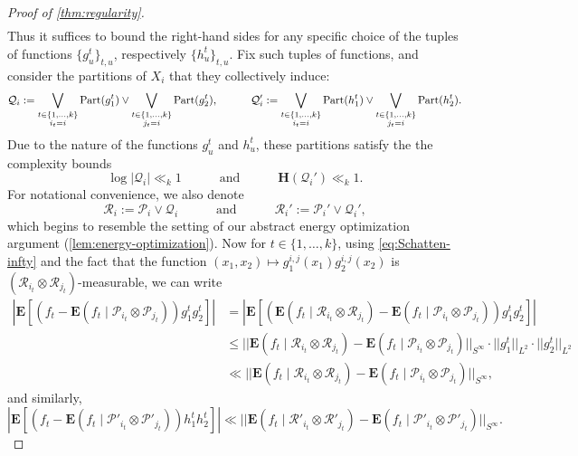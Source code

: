 \documentclass[reqno,11pt]{amsart}
\theoremstyle{definition}
\theoremstyle{remark}
\numberwithin{equation}{section}
\renewcommand{\H}{\mathbf{H}}
\newcommand{\E}{\mathbf{E}}
\newcommand{\mR}{\mathcal{R}}
\newcommand{\mP}{\mathcal{P}}
\newcommand{\mQ}{\mathcal{Q}}
\newcommand{\Part}{\textnormal{Part}}
\begin{document}
\begin{proof}[Proof of \cref{thm:regularity}]
\begin{gather*}
\end{gather*}
Thus it suffices to bound the right-hand sides for any specific choice of the tuples of functions $\{g^t_u\}_{t,u}$, respectively $\{h^t_u\}_{t,u}$. Fix such tuples of functions, and consider the partitions of $X_i$ that they collectively induce:
\[
    \mQ_i := \bigvee_{\substack{t \in \{1, \ldots, k\} \\ i_t = i}} \Part(g^t_1) \vee 
    \bigvee_{\substack{t \in \{1, \ldots, k\} \\ j_t = i}} \Part(g^t_2),
    \qquad\quad
    \mQ_i' := \bigvee_{\substack{t \in \{1, \ldots, k\} \\ i_t = i}} \Part(h^t_1) \vee 
    \bigvee_{\substack{t \in \{1, \ldots, k\} \\ j_t = i}} \Part(h^t_2).
\] 
Due to the nature of the functions $g^t_u$ and $h^t_u$, these partitions satisfy the the complexity bounds
\begin{equation}\label{eq:complexity-bounds}
    \log |\mQ_i| \ll_k 1 \qquad\quad \text{and} \qquad\quad 
    \H(\mQ_i') \ll_k 1.
\end{equation}
For notational convenience, we also denote
\begin{equation}\label{eq:joint-partitions}
    \mR_i := \mP_i \vee \mQ_i \qquad\quad \text{and} \qquad\quad 
    \mR_i' := \mP_i' \vee \mQ_i',
\end{equation}
which begins to resemble the setting of our abstract energy optimization argument (\cref{lem:energy-optimization}). Now for $t \in \{1, \ldots, k\}$, using \cref{eq:Schatten-infty} and the fact that the function $(x_1, x_2) \mapsto g_1^{i,j}(x_1) g_2^{i,j}(x_2)$ is $(\mR_{i_t} \otimes \mR_{j_t})$-measurable, we can write
\[
\begin{aligned}
    \left\vert \E[(f_t - \E(f_t \mid \mP_{i_t} \otimes \mP_{j_t}))g^t_1 g^t_2]\right\vert
    &=
    \left\vert \E[(\E(f_t \mid \mR_{i_t} \otimes \mR_{j_t}) - \E(f_t \mid \mP_{i_t} \otimes \mP_{j_t})) g^t_1 g^t_2]\right\vert
    \\
    &\le
    ||\E(f_t \mid \mR_{i_t} \otimes \mR_{j_t}) - \E(f_t \mid \mP_{i_t} \otimes \mP_{j_t})||_{S^\infty} \cdot ||g_1^t||_{L^2} \cdot ||g_2^t||_{L^2} 
    \\
    &\ll
    ||\E(f_t \mid \mR_{i_t} \otimes \mR_{j_t}) - \E(f_t \mid \mP_{i_t} \otimes \mP_{j_t})||_{S^\infty},
\end{aligned}
\]
and similarly,
\[
    \left\vert \E[(f_t - \E(f_t \mid \mP'_{i_t} \otimes \mP'_{j_t}))h^t_1 h^t_2]\right\vert \ll
    ||\E(f_t \mid \mR'_{i_t} \otimes \mR'_{j_t}) - \E(f_t \mid \mP'_{i_t} \otimes \mP'_{j_t})||_{S^\infty}.
\]
\end{proof}
\end{document}
